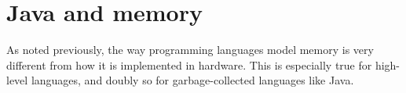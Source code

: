 \chapter{Java and memory}

As noted previously, the way programming languages model memory is very
different from how it is implemented in hardware. This is especially true for
high-level languages, and doubly so for garbage-collected languages like Java.
